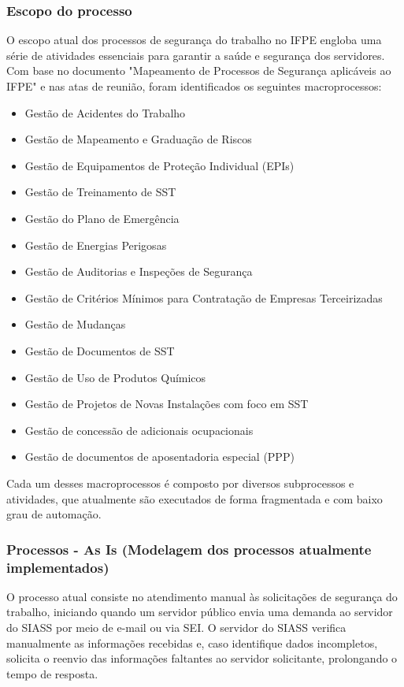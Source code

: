\documentclass[12pt,a4paper]{article}
\begin{document}
\subsubsection{Escopo do processo}
O escopo atual dos processos de segurança do trabalho no IFPE engloba uma série de atividades essenciais para garantir a saúde e segurança dos servidores. Com base no documento "Mapeamento de Processos de Segurança aplicáveis ao IFPE" e nas atas de reunião, foram identificados os seguintes macroprocessos:

\begin{itemize}
    \item Gestão de Acidentes do Trabalho
    \item Gestão de Mapeamento e Graduação de Riscos
    \item Gestão de Equipamentos de Proteção Individual (EPIs)
    \item Gestão de Treinamento de SST
    \item Gestão do Plano de Emergência
    \item Gestão de Energias Perigosas
    \item Gestão de Auditorias e Inspeções de Segurança
    \item Gestão de Critérios Mínimos para Contratação de Empresas Terceirizadas
    \item Gestão de Mudanças
    \item Gestão de Documentos de SST
    \item Gestão de Uso de Produtos Químicos
    \item Gestão de Projetos de Novas Instalações com foco em SST
    \item Gestão de concessão de adicionais ocupacionais
    \item Gestão de documentos de aposentadoria especial (PPP)
\end{itemize}

Cada um desses macroprocessos é composto por diversos subprocessos e atividades, que atualmente são executados de forma fragmentada e com baixo grau de automação.

\subsubsection{Processos - As Is (Modelagem dos processos atualmente implementados)}

O processo atual consiste no atendimento manual às solicitações de segurança do trabalho, iniciando quando um servidor público envia uma demanda ao servidor do SIASS por meio de e-mail ou via SEI. O servidor do SIASS verifica manualmente as informações recebidas e, caso identifique dados incompletos, solicita o reenvio das informações faltantes ao servidor solicitante, prolongando o tempo de resposta.
\end{document}

